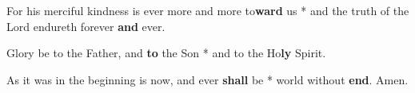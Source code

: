 \begin{multicols}{2}
	For his merciful kindness is ever more and more to\textbf{ward} us * and the truth of the Lord endureth forever \textbf{and} ever.
	
	Glory be to the Father, and \textbf{to} the Son * and to the Ho\textbf{ly} Spirit.
	
	As it was in the beginning is now, and ever \textbf{shall} be * world without \textbf{end}. Amen.
\end{multicols}